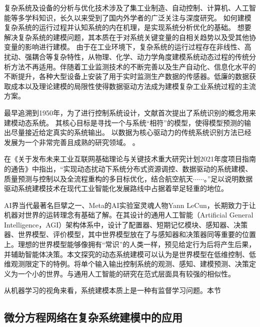 复杂系统及设备的分析与优化技术涉及了集工业制造、自动控制、计算机、人工智能等多学科知识，长久以来受到了国内外学者的广泛关注与深度研究。
如何建模复杂系统的运行过程并认知系统的内在机理，是实现系统分析优化的基础。
想要解决复杂系统的建模问题，其本质在于对系统关键变量的自相关趋势以及受其他协变量的影响进行建模。
由于在工业环境下，复杂系统的运行过程存在非线性、高扰动、强耦合等复杂特性，从物理、化学、动力学角度建模系统动态过程的传统分析方法不再适用。伴随着工业监测技术的不断完善以及生产自动化、信息化水平的不断提升，各种大型设备上安装了用于实时监测生产数据的传感器。低廉的数据获取成本以及理论建模的局限性使得数据驱动方法成为建模复杂工业系统过程的主流方案。

最早追溯到1950年，为了进行控制系统设计，文献\cite{zadeh1956identification}首次提出了系统识别的概念用来建模动态系统。
其核心目标是寻找一个与系统“相符”的模型，使得模型预测的输出尽量接近给定真实的系统输出。
以数据为核心驱动力的传统系统识别方法已经发展为一个非常完善且成熟的研究领域。
\cite{le2013system,gevers2006personal,ljung2008perspectives,ljung2011four,Ljung2020}。

在《关于发布未来工业互联网基础理论与关键技术重大研究计划2021年度项目指南的通告》中指出，“实现动态扰动下系统分布式资源调控、数据驱动的系统建模、质量预测与控制以及全流程重构的多目标优化，结合航空航天$\cdots\cdots$。”足以说明数据驱动系统建模技术在现代工业智能化发展路线中占据着举足轻重的地位。

AI界当代最著名巨擘之一、Meta的AI实验室灵魂人物Yann LeCun，长期致力于让机器对世界的运转理念有基础了解。在其设计的通用人工智能（Artificial General Intelligence，AGI）架构体系中，设计了配置器、短期记忆模块、感知器、决策器、世界模型、评价模型，其中世界模型放在了与感知器和决策器同等重要的位置上。理想的世界模型能够像拥有“常识”的人类一样，预见给定行为后将产生后果，并辅助智能体决策。本文探究的动态系统建模可以认为是世界模型在低维控制、低维观测限定下的特例。将单个输入输出控制系统的观测、感知、建模预测、决策定义为一个小的世界。与通用人工智能的研究在范式层面具有较强的相似性。

从机器学习的视角来看，系统建模本质上是一种有监督学习问题\cite{jordan1992forward}。本节

\subsection{微分方程网络在复杂系统建模中的应用}

